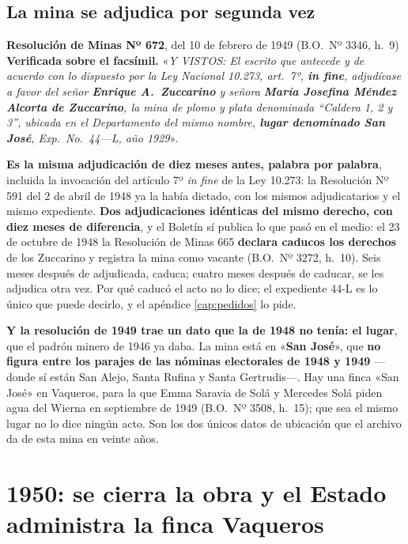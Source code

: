 \subsection*{La mina se adjudica por segunda vez}

\begin{ficha}{\textbf{Resolución de Minas Nº 672}, del 10 de febrero de 1949 (B.O.\ Nº 3346, h.\ 9)}
\textbf{Verificada sobre el facsímil.} «\textit{Y VISTOS: El escrito que antecede y de acuerdo
con lo dispuesto por la Ley Nacional 10.273, art.\ 7º, \textbf{in fine}, adjudícase a favor del
señor \textbf{Enrique A.\ Zuccarino} y señora \textbf{María Josefina Méndez Alcorta de
Zuccarino}, la mina de plomo y plata denominada ``Caldera 1, 2 y 3'', ubicada en el Departamento
del mismo nombre, \textbf{lugar denominado San José}, Exp.\ No.\ 44---L, año 1929}».
\end{ficha}

\begin{cautela}
\textbf{Es la misma adjudicación de diez meses antes, palabra por palabra}, incluida la
invocación del artículo 7º \textit{in fine} de la Ley 10.273: la Resolución Nº 591 del 2 de
abril de 1948 ya la había dictado, con los mismos adjudicatarios y el mismo expediente.
\textbf{Dos adjudicaciones idénticas del mismo derecho, con diez meses de diferencia}, y el
Boletín sí publica lo que pasó en el medio: el 23 de octubre de 1948 la Resolución de Minas 665
\textbf{declara caducos los derechos} de los Zuccarino y registra la mina como vacante (B.O.\ Nº 3272,
h.\ 10). Seis meses después de adjudicada, caduca; cuatro meses después de caducar, se les adjudica
otra vez. Por qué caducó el acto no lo dice; el expediente 44-L es lo único que puede decirlo, y el
apéndice \ref{cap:pedidos} lo pide.

\textbf{Y la resolución de 1949 trae un dato que la de 1948 no tenía: el lugar}, que el padrón
minero de 1946 ya daba. La mina está en «\textbf{San José}», que \textbf{no figura entre los parajes de
las nóminas electorales de 1948 y 1949} ---donde sí están San Alejo, Santa Rufina y Santa
Gertrudis---. Hay una finca «San José» en Vaqueros, para la que Emma Saravia de Solá y Mercedes Solá
piden agua del Wierna en septiembre de 1949 (B.O.\ Nº 3508, h.\ 15); que sea el mismo lugar no lo dice
ningún acto. Son los dos únicos datos de ubicación que el archivo da de esta mina en veinte años.
\end{cautela}


\section{1950: se cierra la obra y el Estado administra la finca Vaqueros}

